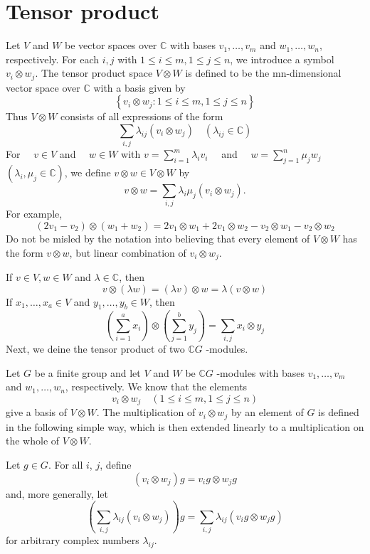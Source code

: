\section{Tensor product}

Let $V$ and $W$ be vector spaces over $\mathbb{C}$ with bases $v_1, \ldots, v_m$ and $w_1, \ldots, w_n$, respectively. For each $i, j$ with $1 \leqslant i \leqslant m, 1 \leqslant j \leqslant n$, we introduce a symbol $v_i \otimes w_j$. The tensor product space $V \otimes W$ is defined to be the mn-dimensional vector space over $\mathbb{C}$ with a basis given by
\[
\left\{v_i \otimes w_j: 1 \leqslant i \leqslant m, 1 \leqslant j \leqslant n\right\}
\]
Thus $V \otimes W$ consists of all expressions of the form
\[
\sum_{i, j} \lambda_{i j}\left(v_i \otimes w_j\right) \quad\left(\lambda_{i j} \in \mathbb{C}\right)
\]
For $\quad v \in V$ and $\quad w \in W$ with $v=\sum_{i=1}^m \lambda_i v_i \quad$ and $\quad w=\sum_{j=1}^n \mu_j w_j$ $\left(\lambda_i, \mu_j \in \mathbb{C}\right)$, we define $v \otimes w \in V \otimes W$ by
\[
v \otimes w=\sum_{i, j} \lambda_i \mu_j\left(v_i \otimes w_j\right) .
\]
For example,
\[
(2v_1-v_2)\otimes (w_1+w_2)=2v_1\otimes w_1+2v_1\otimes w_2-v_2\otimes w_1-v_2\otimes w_2
\]
Do not be misled by the notation into believing that every element of $V\otimes W$ has the form $v\otimes w$, but linear combination of $v_i\otimes w_j$.

If $v\in V, w\in W$ and $\lambda \in \mathbb{C}$, then
\[
v\otimes (\lambda w)=(\lambda v)\otimes w=\lambda(v\otimes w)
\]
If $x_1,\dots, x_{a}\in V$ and $y_1,\dots, y_{b}\in W$, then
\[
\left( \sum_{i=1}^{a} x_i \right)\otimes \left( \sum_{j=1}^{b} y_j \right)=\sum_{i,j}x_i\otimes y_j
\]
Next, we deine the tensor product of two $\mathbb{C}G$ -modules.

Let $G$ be a finite group and let $V$ and $W$ be $\mathbb{C} G$ -modules with bases $v_1, \ldots, v_m$ and $w_1, \ldots, w_n$, respectively. We know that the elements
\[
v_i \otimes w_j \quad(1 \leqslant i \leqslant m, 1 \leqslant j \leqslant n)
\]
give a basis of $V \otimes W$. The multiplication of $v_i \otimes w_j$ by an element of $G$ is defined in the following simple way, which is then extended linearly to a multiplication on the whole of $V \otimes W$.

Let $g\in G$. For all $i$, $j$, define
\[
(v_i\otimes w_j)g=v_ig\otimes w_jg
\]
and, more generally, let
\[
\left( \sum_{i,j}\lambda _{ij} (v_i\otimes w_j)\right)g=\sum_{i,j}\lambda _{ij}(v_ig\otimes w_jg)
\]
for arbitrary complex numbers $\lambda _{ij}$.

